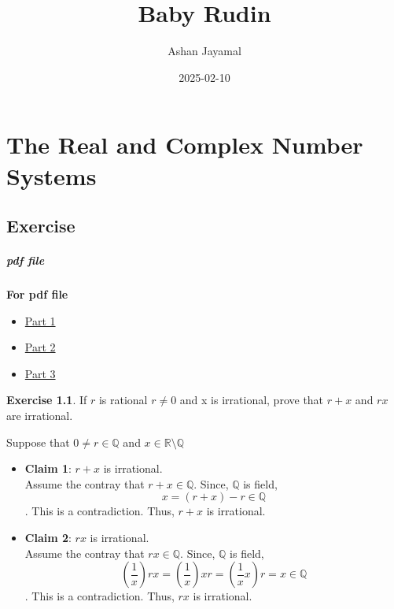 \documentclass[
]{book}
\title{Baby Rudin}
\author{Ashan Jayamal}
\date{2025-02-10}
\providecommand{\tightlist}{%
  \setlength{\itemsep}{0pt}\setlength{\parskip}{0pt}}
\theoremstyle{definition}
\theoremstyle{definition}
\theoremstyle{definition}
\newtheorem{exercise}{Exercise}[chapter]
\theoremstyle{definition}
\theoremstyle{remark}
\begin{document}
\maketitle

{
\setcounter{tocdepth}{1}
\tableofcontents
}
\chapter{The Real and Complex Number Systems}\label{the-real-and-complex-number-systems}

\section{Exercise}\label{exercise}

\paragraph{pdf file}\label{pdf-file}

\textbf{For pdf file}

\begin{itemize}
\tightlist
\item
  \href{pdf_docs/Rudin\%20Ch1.1.pdf}{Part 1}
\item
  \href{pdf_docs/Rudin\%20Ch1.2.pdf}{Part 2}
\item
  \href{pdf_docs/Rudin\%20Ch1.3.pdf}{Part 3}
\end{itemize}

\begin{exercise}
\protect\hypertarget{exr:unnamed-chunk-1}{}\label{exr:unnamed-chunk-1}If \(r\) is rational \(r\neq 0\) and x is irrational, prove that \(r + x\) and \(rx\) are irrational.
\end{exercise}

Suppose that \(0 \neq r \in \mathbb{Q}\) and \(x\in \mathbb{R}\setminus \mathbb{Q}\)

\begin{itemize}
\item
  \textbf{Claim 1}: \(r+x\) is irrational.\\
  Assume the contray that \(r+x\in \mathbb{Q}\). Since, \(\mathbb{Q}\) is field,
  \[x=(r+x)-r\in \mathbb{Q}\]. This is a contradiction. Thus, \(r+x\) is irrational.
\item
  \textbf{Claim 2}: \(rx\) is irrational.\\
  Assume the contray that \(rx\in \mathbb{Q}\). Since, \(\mathbb{Q}\) is field,
  \[\left(\frac{1}{x}\right)rx=\left(\frac{1}{x}\right)xr=\left(\frac{1}{x}x\right)r=x\in \mathbb{Q}\]. This is a contradiction. Thus, \(rx\) is irrational.
\end{itemize}
\end{document}
